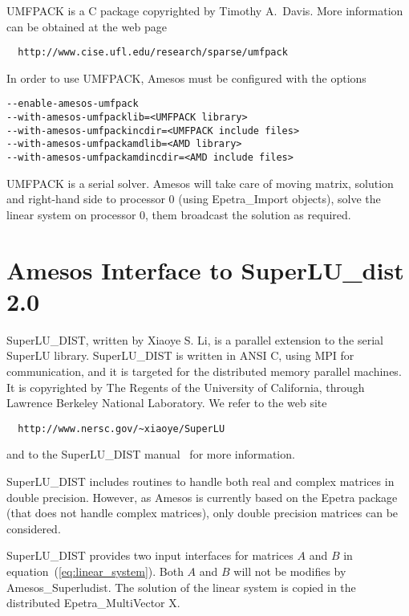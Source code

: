 \documentclass[11pt]{SANDreport}
\begin{document}
UMFPACK is a C package copyrighted by Timothy A.~Davis. More information
can be obtained at the web page
\begin{verbatim}
  http://www.cise.ufl.edu/research/sparse/umfpack
\end{verbatim}

In order to use UMFPACK, Amesos must be configured with the options
\begin{verbatim}
--enable-amesos-umfpack 
--with-amesos-umfpacklib=<UMFPACK library> 
--with-amesos-umfpackincdir=<UMFPACK include files>
--with-amesos-umfpackamdlib=<AMD library>
--with-amesos-umfpackamdincdir=<AMD include files>
\end{verbatim}

UMFPACK is a serial solver. Amesos will take care of moving matrix,
solution and right-hand side to processor 0 (using Epetra\_Import
objects), solve the linear system on processor 0, them broadcast the
solution as required.




\section{Amesos Interface to SuperLU\_dist 2.0}
\label{sec:superludist}

SuperLU\_DIST, written by Xiaoye S. Li, is a parallel extension to the
serial SuperLU library.  SuperLU\_DIST is written in ANSI C, using MPI
for communication, and it is targeted for the distributed memory
parallel machines. It is copyrighted by The Regents of the University of
California, through Lawrence Berkeley National Laboratory.  We refer to
the web site
\begin{verbatim}
  http://www.nersc.gov/~xiaoye/SuperLU
\end{verbatim}
and to the SuperLU\_DIST manual~\cite{superlu-manual} for more
information.

SuperLU\_DIST includes routines to handle both real and complex matrices
in double precision. However, as Amesos is currently based on the Epetra
package (that does not handle complex matrices), only double precision
matrices can be considered.

SuperLU\_DIST provides two input interfaces for matrices $A$ and $B$ in
equation~(\ref{eq:linear_system}).  Both $A$ and $B$ will not be
modifies by Amesos\_Superludist. The solution of the linear system is
copied in the distributed Epetra\_MultiVector X.
\end{document}
